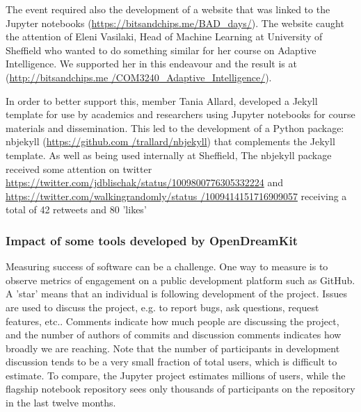 \begin{enumerate}
The event required also the development of a website that was linked to the Jupyter notebooks (\url{https://bitsandchips.me/BAD_days/}). The
website caught the attention of Eleni Vasilaki, Head of Machine Learning at University of Sheffield who wanted to do something similar for
her course on Adaptive Intelligence. We supported her in this endeavour and the result is at (\url{http://bitsandchips.me
/COM3240_Adaptive_Intelligence/}).

In order to better support this, \ODK member Tania Allard, developed a Jekyll template for use by academics and researchers using Jupyter
notebooks for course materials and dissemination. This led to the development of a Python package: nbjekyll (\url{https://github.com
/trallard/nbjekyll}) that complements the Jekyll template. As well as being used internally at Sheffield, The nbjekyll package received some
attention on twitter \url{https://twitter.com/jdblischak/status/1009800776305332224} and \url{https://twitter.com/walkingrandomly/status
/1009414151716909057} receiving a total of 42 retweets and 80 'likes'%
\end{enumerate}

\subsubsection{Impact of some tools developed by OpenDreamKit}



Measuring success of software can be a challenge.
One way to measure is to observe metrics of engagement on
a public development platform such as GitHub.
A 'star' means that an individual is following development of the project.
Issues are used to discuss the project, e.g. to report bugs, ask questions, request features, etc..
Comments indicate how much people are discussing the project,
and the number of authors of commits and discussion comments indicates
how broadly we are reaching.
Note that the number of participants in development discussion tends to be a very small fraction of total users,
which is difficult to estimate.
To compare, the Jupyter project estimates millions of users,
while the flagship notebook repository sees only thousands of participants on the repository in the last twelve months.

